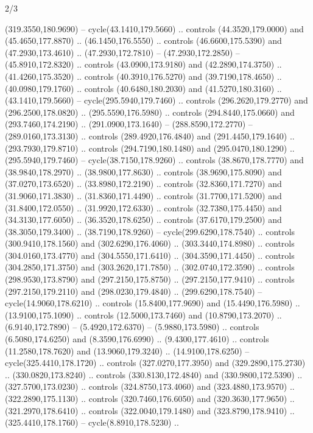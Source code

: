 \begin{flagdescription}{2/3}
\begin{scope}[xshift=0.5\flaglength,yshift=0.5\flagwidth,scale=\stretchfactor]
\begin{scope}[scale=0.001645\flagwidth,yshift=65mm,xshift=-63mm]
\begin{scope}[y=0.80pt, x=0.80pt, yscale=-1,]
\begin{scope}[cm={{1.33333,0.0,0.0,1.33333,(0.0,1e-05)}}]
  (319.3550,180.9690) -- cycle(43.1410,179.5660) .. controls (44.3520,179.0000)
  and (45.4650,177.8870) .. (46.1450,176.5550) .. controls (46.6600,175.5390)
  and (47.2930,173.4610) .. (47.2930,172.7810) -- (47.2930,172.2850) --
  (45.8910,172.8320) .. controls (43.0900,173.9180) and (42.2890,174.3750) ..
  (41.4260,175.3520) .. controls (40.3910,176.5270) and (39.7190,178.4650) ..
  (40.0980,179.1760) .. controls (40.6480,180.2030) and (41.5270,180.3160) ..
  (43.1410,179.5660) -- cycle(295.5940,179.7460) .. controls (296.2620,179.2770)
  and (296.2500,178.0820) .. (295.5590,176.5980) .. controls (294.8440,175.0660)
  and (293.7460,174.2190) .. (291.0900,173.1640) -- (288.8590,172.2770) --
  (289.0160,173.3130) .. controls (289.4920,176.4840) and (291.4450,179.1640) ..
  (293.7930,179.8710) .. controls (294.7190,180.1480) and (295.0470,180.1290) ..
  (295.5940,179.7460) -- cycle(38.7150,178.9260) .. controls (38.8670,178.7770)
  and (38.9840,178.2970) .. (38.9800,177.8630) .. controls (38.9690,175.8090)
  and (37.0270,173.6520) .. (33.8980,172.2190) .. controls (32.8360,171.7270)
  and (31.9060,171.3830) .. (31.8360,171.4490) .. controls (31.7700,171.5200)
  and (31.8400,172.0550) .. (31.9920,172.6330) .. controls (32.7380,175.4450)
  and (34.3130,177.6050) .. (36.3520,178.6250) .. controls (37.6170,179.2500)
  and (38.3050,179.3400) .. (38.7190,178.9260) -- cycle(299.6290,178.7540) ..
  controls (300.9410,178.1560) and (302.6290,176.4060) .. (303.3440,174.8980) ..
  controls (304.0160,173.4770) and (304.5550,171.6410) .. (304.3590,171.4450) ..
  controls (304.2850,171.3750) and (303.2620,171.7850) .. (302.0740,172.3590) ..
  controls (298.9530,173.8790) and (297.2150,175.8750) .. (297.2150,177.9410) ..
  controls (297.2150,179.2110) and (298.0230,179.4840) .. (299.6290,178.7540) --
  cycle(14.9060,178.6210) .. controls (15.8400,177.9690) and (15.4490,176.5980)
  .. (13.9100,175.1090) .. controls (12.5000,173.7460) and (10.8790,173.2070) ..
  (6.9140,172.7890) -- (5.4920,172.6370) -- (5.9880,173.5980) .. controls
  (6.5080,174.6250) and (8.3590,176.6990) .. (9.4300,177.4610) .. controls
  (11.2580,178.7620) and (13.9060,179.3240) .. (14.9100,178.6250) --
  cycle(325.4410,178.1720) .. controls (327.0270,177.3950) and
  (329.2890,175.2730) .. (330.0820,173.8240) .. controls (330.8130,172.4840) and
  (330.9800,172.5390) .. (327.5700,173.0230) .. controls (324.8750,173.4060) and
  (323.4880,173.9570) .. (322.2890,175.1130) .. controls (320.7460,176.6050) and
  (320.3630,177.9650) .. (321.2970,178.6410) .. controls (322.0040,179.1480) and
  (323.8790,178.9410) .. (325.4410,178.1760) -- cycle(8.8910,178.5230) ..

\end{scope}
\end{scope}
\end{scope}
\end{scope}
\end{flagdescription}
